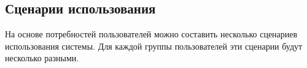 \subsection*{\large{Сценарии использования}}

На основе потребностей пользователей можно составить несколько сценариев использования системы.
Для каждой группы пользователей эти сценарии будут несколько разными.

